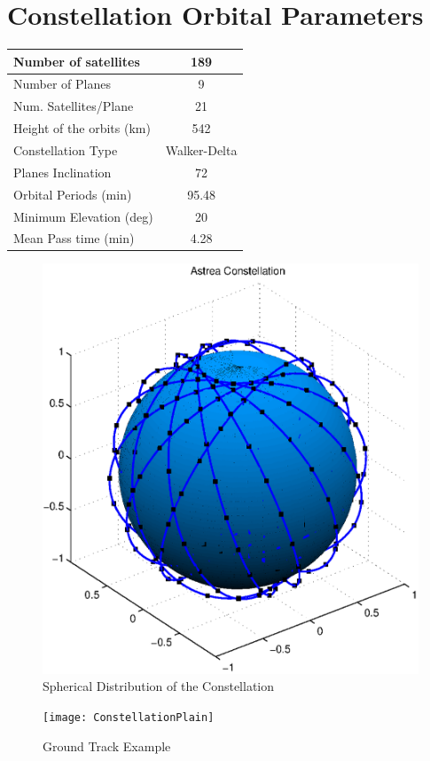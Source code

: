 \section{Constellation Orbital Parameters}

\begin{minipage}{0.5\textwidth}
\begin{tabular}{|l|c|}
	\hline
	Number of satellites & 189 \\ \hline
	Number of Planes & 9 \\ \hline
	Num. Satellites/Plane & 21 \\ \hline
	Height of the orbits (km) & 542 \\ \hline
	Constellation Type & Walker-Delta \\ \hline
	Planes Inclination & 72 \\ \hline
	Orbital Periods (min) & 95.48 \\ \hline
	Minimum Elevation (deg) & 20 \\ \hline
	Mean Pass time (min) & 4.28 \\ \hline
\end{tabular}
\end{minipage} \hfill
\begin{minipage}{0.45\textwidth}
\begin{figure}[H]
	\includegraphics[scale=0.6]{ConstellationSphere}
	\caption{Spherical Distribution of the Constellation}	
\end{figure}
\end{minipage}

\begin{figure}[h]
	\centering  
	\texttt{[image: ConstellationPlain]}
	\caption{Ground Track Example}	
\end{figure}